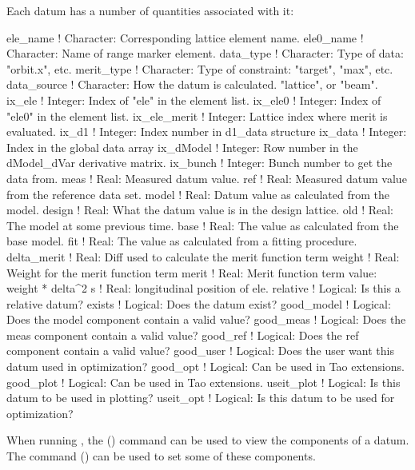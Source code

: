 Each datum has a number of quantities associated with it:
\begin{example}
  ele_name       ! Character: Corresponding lattice element name.
  ele0_name      ! Character: Name of range marker element.
  data_type      ! Character: Type of data: "orbit.x", etc.
  merit_type     ! Character: Type of constraint: "target", "max", etc.
  data_source    ! Character: How the datum is calculated. "lattice", or "beam".
  ix_ele            ! Integer: Index of "ele" in the element list.
  ix_ele0           ! Integer: Index of "ele0" in the element list.
  ix_ele_merit      ! Integer: Lattice index where merit is evaluated.
  ix_d1             ! Integer: Index number in d1_data structure
  ix_data           ! Integer: Index in the global data array
  ix_dModel         ! Integer: Row number in the dModel_dVar derivative matrix.
  ix_bunch          ! Integer: Bunch number to get the data from.
  meas              ! Real: Measured datum value. 
  ref               ! Real: Measured datum value from the reference data set.
  model             ! Real: Datum value as calculated from the model.
  design            ! Real: What the datum value is in the design lattice.
  old               ! Real: The model at some previous time.
  base              ! Real: The value as calculated from the base model.
  fit               ! Real: The value as calculated from a fitting procedure.
  delta_merit       ! Real: Diff used to calculate the merit function term 
  weight            ! Real: Weight for the merit function term
  merit             ! Real: Merit function term value: weight * delta^2
  s                 ! Real: longitudinal position of ele.
  relative          ! Logical: Is this a relative datum?
  exists            ! Logical: Does the datum exist?
  good_model        ! Logical: Does the model component contain a valid value?
  good_meas         ! Logical: Does the meas component contain a valid value?
  good_ref          ! Logical: Does the ref component contain a valid value?
  good_user         ! Logical: Does the user want this datum used in optimization?
  good_opt          ! Logical: Can be used in Tao extensions.
  good_plot         ! Logical: Can be used in Tao extensions.
  useit_plot        ! Logical: Is this datum to be used in plotting?
  useit_opt         ! Logical: Is this datum to be used for optimization?
\end{example}
When running \tao, the 
() command can be used to view the components of a datum. 
The  command () can be used to set some of these components.

